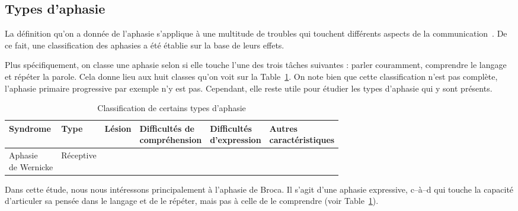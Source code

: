 \subsection{Types d'aphasie}

La définition qu'on a donnée de l'aphasie s'applique à une multitude de troubles  
qui touchent différents aspects de la communication~\cite[p. 135, 136]{Hallowell_2017}.
De ce fait, une classification des aphasies a été établie sur la base de leurs effets.

Plus spécifiquement, on classe une aphasie selon si elle touche l'une des trois tâches suivantes :
parler couramment, comprendre le langage et répéter la parole. 
Cela donne lieu aux huit classes qu'on voit sur la Table~\ref{tab.aphasia-classification}.
On note  bien que cette classification n'est pas complète, l'aphasie primaire progressive par exemple n'y est pas.
Cependant, elle reste utile pour étudier les types d'aphasie qui y sont présents.

\begin{table}[ht]
    \centering
    \begin{longtable}{|llllll|}
    \hline
    Syndrome &  Type & Lésion & 
    \makecell{Difficultés de\\compréhension} & \makecell{Difficultés\\d'expression} & 
    \makecell{Autres\\caractéristiques} \\
    \hline
    \makecell{Aphasie\\de Wernicke} & Réceptive & & & & \\
    \hline
    \end{longtable}
    \caption{Classification de certains types d'aphasie}
    \label{tab.aphasia-classification}
\end{table}


Dans cette étude, nous nous intéressons principalement à l'aphasie de Broca.
Il s'agit d'une aphasie expressive, 
c--à--d qui touche la capacité d'articuler sa pensée dans le langage et de le répéter, 
mais pas à celle de le comprendre (voir Table~\ref{tab.aphasia-classification}).